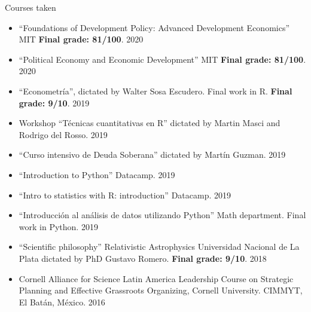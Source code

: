 \documentclass{resume} %
\begin{document}
\begin{rSection}{Courses taken}
\begin{itemize}
\item “Foundations of Development Policy: Advanced Development Economics” MIT  {\bf Final grade: 81/100}. 2020
\item “Political Economy and Economic Development” MIT {\bf Final grade: 81/100}. 2020
\item “Econometría”, dictated by Walter Sosa Escudero. Final work in R. {\bf Final grade: 9/10}. 2019
\item Workshop “Técnicas cuantitativas en R” dictated by Martin Masci and Rodrigo del Rosso. 2019 
\item “Curso intensivo de Deuda Soberana” dictated by Martín Guzman. 2019
\item “Introduction to Python” Datacamp. 2019
\item “Intro to statistics with R: introduction” Datacamp. 2019
\item “Introducción al análisis de datos utilizando Python” Math department. Final work in Python. 2019
\item “Scientific philosophy” Relativistic Astrophysics Universidad Nacional de La Plata dictated by PhD Gustavo Romero. {\bf Final grade: 9/10}. 2018
\item Cornell Alliance for Science Latin America Leadership Course on Strategic Planning and Effective Grassroots Organizing, Cornell University. CIMMYT, El Batán, México. 2016
\end{itemize}
\end{rSection}



\end{document}
